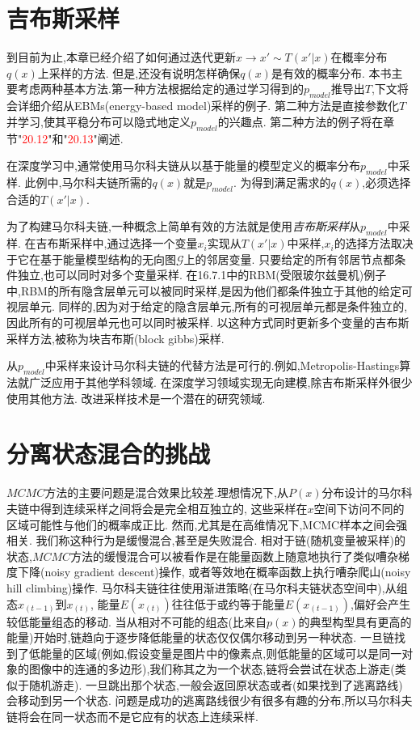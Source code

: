 \section{吉布斯采样}
\label{sec:17.4}

到目前为止,本章已经介绍了如何通过迭代更新$x\rightarrow x' \sim T (x'|x) $在概率分布$q(x)$上采样的方法.
但是,还没有说明怎样确保$q(x)$是有效的概率分布.
本书主要考虑两种基本方法.第一种方法根据给定的通过学习得到的$p_{model}$推导出$T$,下文将会详细介绍从EBMs(energy-based model)采样的例子.
第二种方法是直接参数化$T$并学习,使其平稳分布可以隐式地定义$p_{model}$的兴趣点.
第二种方法的例子将在章节"\textcolor{red}{20.12}"和"\textcolor{red}{20.13}"阐述.

在深度学习中,通常使用马尔科夫链从以基于能量的模型定义的概率分布$p_{model}$中采样.
此例中,马尔科夫链所需的$q(x)$就是$p_{model}$.
为得到满足需求的$q(x)$,必须选择合适的$T(x'|x)$.

为了构建马尔科夫链,一种概念上简单有效的方法就是使用\textit{吉布斯采样}从$p_{model}$中采样.
在吉布斯采样中,通过选择一个变量$x_i$实现从$T(x'|x)$中采样,$x_i$的选择方法取决于它在基于能量模型结构的无向图$\mathcal{G}$上的邻居变量.
只要给定的所有邻居节点都条件独立,也可以同时对多个变量采样.
在16.7.1中的RBM(受限玻尔兹曼机)例子中,RBM的所有隐含层单元可以被同时采样,是因为他们都条件独立于其他的给定可视层单元.
同样的,因为对于给定的隐含层单元,所有的可视层单元都是条件独立的,因此所有的可视层单元也可以同时被采样.
以这种方式同时更新多个变量的吉布斯采样方法,被称为块吉布斯(block gibbs)采样.

从$p_{model}$中采样来设计马尔科夫链的代替方法是可行的.例如,Metropolis-Hastings算法就广泛应用于其他学科领域.
在深度学习领域实现无向建模,除吉布斯采样外很少使用其他方法.
改进采样技术是一个潜在的研究领域.

\section{分离状态混合的挑战}
\label{sec:17.5}

$MCMC$方法的主要问题是混合效果比较差.理想情况下,从$P(x)$分布设计的马尔科夫链中得到连续采样之间将会是完全相互独立的,
这些采样在$x$空间下访问不同的区域可能性与他们的概率成正比.
然而,尤其是在高维情况下,MCMC样本之间会强相关.
我们称这种行为是缓慢混合,甚至是失败混合.
相对于链(随机变量被采样)的状态,$MCMC$方法的缓慢混合可以被看作是在能量函数上随意地执行了类似嘈杂梯度下降(noisy gradient descent)操作,
或者等效地在概率函数上执行嘈杂爬山(noisy hill climbing)操作.
马尔科夫链往往使用渐进策略(在马尔科夫链状态空间中),从组态$x_{(t-1)}$到$x_{(t)}$,
能量$E(x_{(t)})$往往低于或约等于能量$E(x_{(t-1)})$,偏好会产生较低能量组态的移动.
当从相对不可能的组态(比来自$p(x)$的典型构型具有更高的能量)开始时,链趋向于逐步降低能量的状态仅仅偶尔移动到另一种状态.
一旦链找到了低能量的区域(例如,假设变量是图片中的像素点,则低能量的区域可以是同一对象的图像中的连通的多边形),我们称其之为一个状态,链将会尝试在状态上游走(类似于随机游走).
一旦跳出那个状态,一般会返回原状态或者(如果找到了逃离路线)会移动到另一个状态.
问题是成功的逃离路线很少有很多有趣的分布,所以马尔科夫链将会在同一状态而不是它应有的状态上连续采样.

